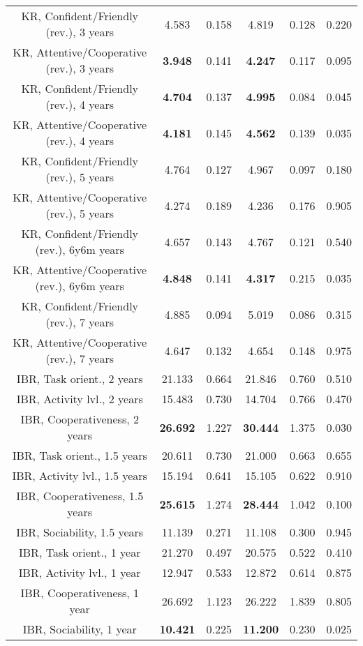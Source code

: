 \begin{longtable}{c c c c c c}
KR, Confident/Friendly (rev.), 3 years & 4.583 & 0.158 &  4.819 & 0.128 & 0.220 \\
KR, Attentive/Cooperative (rev.), 3 years & \textbf{3.948} & 0.141 &  \textbf{4.247} & 0.117 & 0.095 \\
KR, Confident/Friendly (rev.), 4 years & \textbf{4.704} & 0.137 &  \textbf{4.995} & 0.084 & 0.045 \\
KR, Attentive/Cooperative (rev.), 4 years & \textbf{4.181} & 0.145 &  \textbf{4.562} & 0.139 & 0.035 \\
KR, Confident/Friendly (rev.), 5 years & 4.764 & 0.127 &  4.967 & 0.097 & 0.180 \\
KR, Attentive/Cooperative (rev.), 5 years & 4.274 & 0.189 &  4.236 & 0.176 & 0.905 \\
KR, Confident/Friendly (rev.), 6y6m years & 4.657 & 0.143 &  4.767 & 0.121 & 0.540 \\
KR, Attentive/Cooperative (rev.), 6y6m years & \textbf{4.848} & 0.141 &  \textbf{4.317} & 0.215 & 0.035 \\
KR, Confident/Friendly (rev.), 7 years & 4.885 & 0.094 &  5.019 & 0.086 & 0.315 \\
KR, Attentive/Cooperative (rev.), 7 years & 4.647 & 0.132 &  4.654 & 0.148 & 0.975 \\
IBR, Task orient., 2 years & 21.133 & 0.664 &  21.846 & 0.760 & 0.510 \\
IBR, Activity lvl., 2 years & 15.483 & 0.730 &  14.704 & 0.766 & 0.470 \\
IBR, Cooperativeness, 2 years & \textbf{26.692} & 1.227 &  \textbf{30.444} & 1.375 & 0.030 \\
IBR, Task orient., 1.5 years & 20.611 & 0.730 &  21.000 & 0.663 & 0.655 \\
IBR, Activity lvl., 1.5 years & 15.194 & 0.641 &  15.105 & 0.622 & 0.910 \\
IBR, Cooperativeness, 1.5 years & \textbf{25.615} & 1.274 &  \textbf{28.444} & 1.042 & 0.100 \\
IBR, Sociability, 1.5 years & 11.139 & 0.271 &  11.108 & 0.300 & 0.945 \\
IBR, Task orient., 1 year & 21.270 & 0.497 &  20.575 & 0.522 & 0.410 \\
IBR, Activity lvl., 1 year & 12.947 & 0.533 &  12.872 & 0.614 & 0.875 \\
IBR, Cooperativeness, 1 year & 26.692 & 1.123 &  26.222 & 1.839 & 0.805 \\
IBR, Sociability, 1 year & \textbf{10.421} & 0.225 &  \textbf{11.200} & 0.230 & 0.025 \\

\end{longtable}
